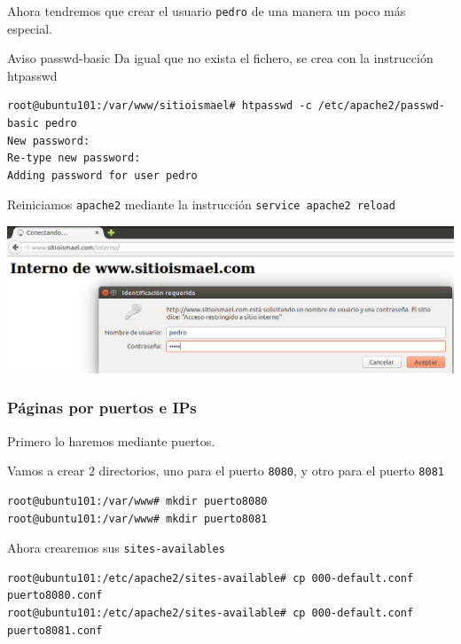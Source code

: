 \documentclass[11pt]{article}
\begin{document}
Ahora tendremos que crear el usuario \texttt{pedro} de una manera un poco más especial.

\begin{alertblock}{Aviso passwd-basic}
Da igual que no exista el fichero, se crea con la instrucción htpasswd
\end{alertblock}

\begin{verbatim}
root@ubuntu101:/var/www/sitioismael# htpasswd -c /etc/apache2/passwd-basic pedro
New password: 
Re-type new password: 
Adding password for user pedro
\end{verbatim}

Reiniciamos \texttt{apache2} mediante la instrucción \texttt{service apache2 reload}

\begin{center}
\includegraphics[width=.9\linewidth]{./media/apache-6.png}
\end{center}
\subsubsection{Páginas por puertos e IPs}
\label{sec:orgfec6a34}
Primero lo haremos mediante puertos.

Vamos a crear 2 directorios, uno para el puerto \texttt{8080}, y otro para el puerto \texttt{8081}
\begin{verbatim}
root@ubuntu101:/var/www# mkdir puerto8080
root@ubuntu101:/var/www# mkdir puerto8081
\end{verbatim}

Ahora crearemos sus \texttt{sites-availables}
\begin{verbatim}
root@ubuntu101:/etc/apache2/sites-available# cp 000-default.conf puerto8080.conf
root@ubuntu101:/etc/apache2/sites-available# cp 000-default.conf puerto8081.conf
\end{verbatim}
\end{document}
